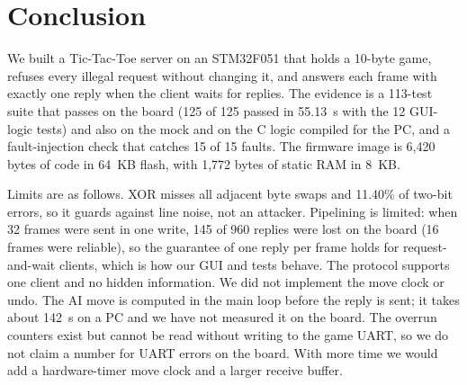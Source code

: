 \section{Conclusion}
\label{sec:conclusion}

We built a Tic-Tac-Toe server on an STM32F051 that holds a 10-byte game, refuses every illegal request without changing it,
and answers each frame with exactly one reply when the client waits for replies. The evidence is a 113-test suite that passes on the board (125 of 125 passed in 55.13~s with the 12 GUI-logic tests) and also on the mock and on the C logic compiled for the PC, and a
fault-injection check that catches 15 of 15 faults. The firmware image is 6{,}420 bytes of code in 64~KB flash, with 1{,}772 bytes of static RAM in 8~KB.

Limits are as follows. XOR misses all adjacent byte swaps and 11.40\% of two-bit errors, so it guards against line noise, not an attacker. Pipelining is limited: when 32 frames were sent in one write, 145 of 960 replies were lost on the board (16 frames were reliable), so the guarantee of one reply per frame holds for request-and-wait clients, which is how our GUI and tests behave. The protocol supports one client and
no hidden information. We did not implement the move clock or undo. The AI move is computed in the main loop before the reply is sent; it takes about 142~\textmu s on a PC and we have not measured it on the board. The overrun counters exist but cannot be read without writing to the game UART, so
we do not claim a number for UART errors on the board. With more time we would add a hardware-timer move clock and a larger receive buffer.
